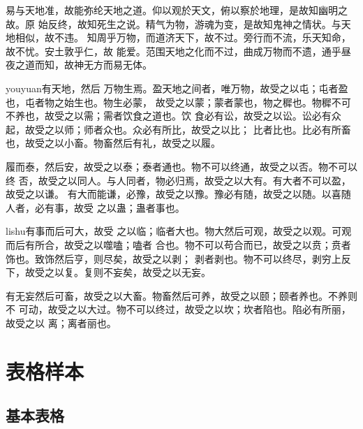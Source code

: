 {\fangsong 易与天地准，故能弥纶天地之道。仰以观於天文，俯以察於地理，是故知幽明之故。原
  始反终，故知死生之说。精气为物，游魂为变，是故知鬼神之情状。与天地相似，故不违。
  知周乎万物，而道济天下，故不过。旁行而不流，乐天知命，故不忧。安土敦乎仁，故
  能爱。范围天地之化而不过，曲成万物而不遗，通乎昼夜之道而知，故神无方而易无体。}

{\ifcsname youyuan\endcsname\youyuan\else[无 \cs{youyuan} 字体。]\fi 有天地，然后
  万物生焉。盈天地之间者，唯万物，故受之以屯；屯者盈也，屯者物之始生也。物生必蒙，
  故受之以蒙；蒙者蒙也，物之穉也。物穉不可不养也，故受之以需；需者饮食之道也。饮
  食必有讼，故受之以讼。讼必有众起，故受之以师；师者众也。众必有所比，故受之以比；
  比者比也。比必有所畜也，故受之以小畜。物畜然后有礼，故受之以履。}

{\heiti 履而泰，然后安，故受之以泰；泰者通也。物不可以终通，故受之以否。物不可以终
  否，故受之以同人。与人同者，物必归焉，故受之以大有。有大者不可以盈，故受之以谦。
  有大而能谦，必豫，故受之以豫。豫必有随，故受之以随。以喜随人者，必有事，故受
  之以蛊；蛊者事也。}

{\ifcsname lishu\endcsname\lishu\else[无 \cs{lishu} 字体。]\fi 有事而后可大，故受
  之以临；临者大也。物大然后可观，故受之以观。可观而后有所合，故受之以噬嗑；嗑者
  合也。物不可以苟合而已，故受之以贲；贲者饰也。致饰然后亨，则尽矣，故受之以剥；
  剥者剥也。物不可以终尽，剥穷上反下，故受之以复。复则不妄矣，故受之以无妄。}

{\songti 有无妄然后可畜，故受之以大畜。物畜然后可养，故受之以颐；颐者养也。不养则不
  可动，故受之以大过。物不可以终过，故受之以坎；坎者陷也。陷必有所丽，故受之以
  离；离者丽也。}

\section{表格样本}
\label{chap1:sample:table} 

\subsection{基本表格}
\label{sec:basictable}

